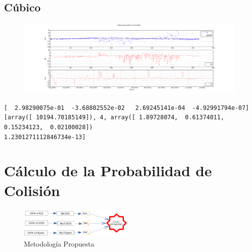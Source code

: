 \subsection*{C\'ubico}
\begin{figure}[!h]
\centering
  \includegraphics[width=\textwidth]{imagenes/sacDajusteG3}
\end{figure}
\begin{verbatim}
[  2.98290075e-01  -3.68802552e-02   2.69245141e-04  -4.92991794e-07]
[array([ 10194.70185149]), 4, array([ 1.89728074,  0.61374011,  0.15234123,  0.02100028])
1.2301271112846734e-13]
\end{verbatim}

\section{C\'alculo de la Probabilidad de Colisi\'on}
\begin{figure}[!h]
\centering
 \includegraphics[width=0.5\textwidth]{imagenes/metodoARxCODE}
 \caption{Metodolog\'ia Propuesta}
 \label{fig:metodoARxCODE}
\end{figure}

